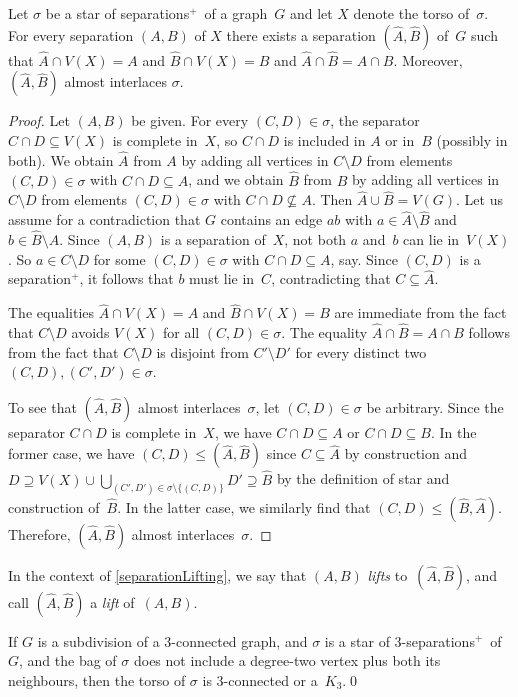 \documentclass{aic}
\newcommand{\se}{\subseteq}
\theoremstyle{plain}
\theoremstyle{definition}
\theoremstyle{plain}
\newcommand{\plus}{${}^+$}
\theoremstyle{plain}
\newcommand{\sm}{\setminus}
\renewcommand{\le}{\leqslant}
\begin{document}
\begin{lem}\label{separationLifting}
Let $\sigma$ be a star of separations\plus\ of a graph~$G$ and let $X$ denote the torso of~$\sigma$.
For every separation $(A,B)$ of $X$ there exists a separation $(\hat A,\hat B)$ of~$G$ such that $\hat A\cap V(X)=A$ and $\hat B\cap V(X)=B$ and $\hat A\cap \hat B=A\cap B$.
Moreover, $(\hat A,\hat B)$ almost interlaces $\sigma$.
\end{lem}
\begin{proof}
Let $(A,B)$ be given.
For every $(C,D)\in\sigma$, the separator $C\cap D\se V(X)$ is complete in~$X$, so $C\cap D$ is included in $A$ or in~$B$ (possibly in both).
We obtain $\hat A$ from $A$ by adding all vertices in $C\sm D$ from elements $(C,D)\in\sigma$ with $C\cap D\se A$, and we obtain $\hat B$ from $B$ by adding all vertices in $C\sm D$ from elements $(C,D)\in\sigma$ with $C\cap D\not\subseteq A$.
Then $\hat A\cup\hat B=V(G)$.
Let us assume for a contradiction that $G$ contains an edge $ab$ with $a\in\hat A\sm\hat B$ and $b\in\hat B\sm\hat A$.
Since $(A,B)$ is a separation of~$X$, not both $a$ and~$b$ can lie in~$V(X)$.
So $a\in C\sm D$ for some $(C,D)\in\sigma$ with $C\cap D\se A$, say.
Since $(C,D)$ is a separation\plus , it follows that $b$ must lie in~$C$, contradicting that $C\se \hat A$.

The equalities $\hat A\cap V(X)=A$ and $\hat B\cap V(X)=B$ are immediate from the fact that $C\sm D$ avoids $V(X)$ for all $(C,D)\in\sigma$.
The equality $\hat A\cap \hat B=A\cap B$ follows from the fact that $C\sm D$ is disjoint from $C'\sm D'$ for every distinct two $(C,D),(C',D')\in\sigma$.

To see that $(\hat A,\hat B)$ almost interlaces~$\sigma$, let $(C,D)\in\sigma$ be arbitrary.
Since the separator $C\cap D$ is complete in~$X$, we have $C\cap D\se A$ or $C\cap D\se B$.
In the former case, we have $(C,D)\le (\hat A,\hat B)$ since $C\se\hat A$ by construction and $D\supseteq V(X)\cup\bigcup_{(C',D')\in\sigma\sm\{(C,D)\}}D'\supseteq\hat B$ by the definition of star and construction of~$\hat B$.
In the latter case, we similarly find that $(C,D)\le (\hat B,\hat A)$.
Therefore, $(\hat A,\hat B)$ almost interlaces~$\sigma$.
\end{proof}


In the context of \autoref{separationLifting}, we say that $(A,B)$ \emph{lifts} to~$(\hat A,\hat B)$, and call $(\hat A,\hat B)$ a \emph{lift} of~$(A,B)$.

\begin{cor}\label{compressed_torso_3con}
    If $G$ is a subdivision of a 3-connected graph, and $\sigma$ is a star of 3-separations\plus\ of~$G$, and the bag of $\sigma$ does not include a degree-two vertex plus both its neighbours, then the torso of $\sigma$ is 3-connected or a~$K_3$.\qed
\end{cor}
\end{document}
